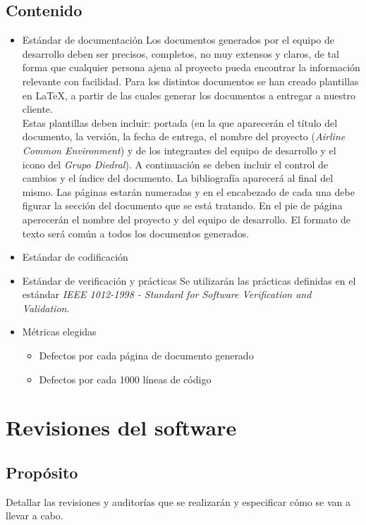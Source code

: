 \documentclass[11pt, a4paper, twoside, titlepage]{article}
\begin{document}
		\subsection{Contenido}
			\begin{itemize}
				\item Estándar de documentación
					Los documentos generados por el equipo de desarrollo deben ser precisos, completos, no muy extensos y claros, de tal forma que cualquier persona ajena al proyecto pueda encontrar la información relevante con facilidad.
Para los distintos documentos se han creado plantillas en {\rmfamily\LaTeX{}}, a partir de las cuales generar los documentos a entregar a nuestro cliente. \\
					Estas plantillas deben incluir: portada (en la que aparecerán el título del documento, la versión, la fecha de entrega, el nombre del proyecto (\textit{Airline Common Environment}) y de los integrantes del equipo de desarrollo y el icono del \textit{Grupo Diedral}). A continuación se deben incluir el control de cambios y el índice del documento. La bibliografía aparecerá al final del mismo. Las páginas estarán numeradas y en el encabezado de cada una debe figurar la sección del documento que se está tratando. En el pie de página aperecerán el nombre del proyecto y del equipo de desarrollo. El formato de texto será común a todos los documentos generados.

				\item Estándar de  codificación %
					

				\item Estándar de verificación y prácticas
					Se utilizarán las prácticas definidas en el estándar \textit{IEEE 1012-1998 - Standard for Software Verification and Validation}.

				\item Métricas elegidas
					\begin{itemize}
						\item Defectos por cada página de documento generado
						\item Defectos por cada 1000 líneas de código
					\end{itemize}
			\end{itemize}			
	\section{Revisiones del software}%
		\subsection{Propósito}
			Detallar las revisiones y auditorías que se realizarán y especificar cómo se van a llevar a cabo.
\end{document}
